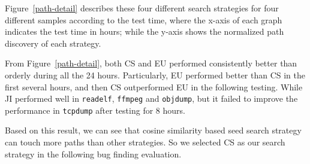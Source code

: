 Figure~\ref{path-detail} describes these four different search strategies for four different samples according to the test time, where the x-axis of each graph indicates the test time in hours; while the y-axis shows the normalized path discovery of each strategy.

From Figure~\ref{path-detail}, both CS and EU performed consistently better than orderly during all the 24 hours. Particularly, EU performed better than CS in the first several hours, and then CS outperformed EU in the following testing. While JI performed well in \texttt{readelf}, \texttt{ffmpeg} and \texttt{objdump}, but it failed to improve the performance in \texttt{tcpdump} after testing for 8 hours.

Based on this result, we can see that cosine similarity based seed search strategy can touch more paths than other strategies. So we selected CS as our search strategy in the following bug finding evaluation.


